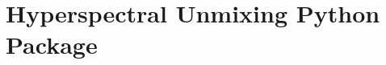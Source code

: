 
\lhead[\fancyplain{}{\leftmark}]%
      {\fancyplain{}{}} %
\chead[\fancyplain{}{}]%
      {\fancyplain{}{}}
\rhead[\fancyplain{}{}]%
      {\fancyplain{}{\rightmark}}%
\lfoot[\fancyplain{}{}]%
      {\fancyplain{}{}}
\cfoot[\fancyplain{}{\thepage}]%
      {\fancyplain{}{\thepage}} %
\rfoot[\fancyplain{}{}]%
     {\fancyplain{}{\scriptsize}}




\chapter{Hyperspectral Unmixing Python Package}
\label{ch:HySUPP}


